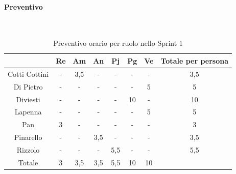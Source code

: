 \documentclass{article}
\begin{document}
                \paragraph{Preventivo}\mbox{}\\
                \begin{table}[H]
                    \centering
                    \begin{tabular}{|c|c|c|c|c|c|c|c|}
                    \hline
                                  & Re  & Am  & An  & Pj  & Pg  & Ve  & Totale per persona \\ \hline
                    Cotti Cottini & -   & 3,5 & -   & -   & -   & -   & 3,5                \\ \hline
                    Di Pietro     & -   & -   & -   & -   & -   & 5   & 5                  \\ \hline
                    Diviesti      & -   & -   & -   & -   & 10  & -   & 10                 \\ \hline
                    Lapenna       & -   & -   & -   & -   & -   & 5   & 5                  \\ \hline
                    Pan           & 3   & -   & -   & -   & -   & -   & 3                  \\ \hline
                    Pinarello     & -   & -   & 3,5 & -   & -   & -   & 3,5                \\ \hline
                    Rizzolo       & -   & -   & -   & 5,5 & -   & -   & 5,5                \\ \hline
                    Totale        & 3   & 3,5 & 3,5 & 5,5 & 10  & 10  &                    \\ \hline
                    \end{tabular}
                    \caption{Preventivo orario per ruolo nello Sprint 1}
                \end{table}

\end{document}
